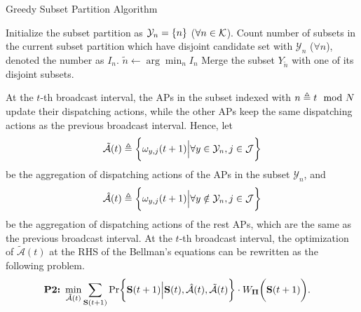 \begin{algorithm}[ht]
    \caption{Greedy Subset Partition Algorithm}\label{alg_0}
    \DontPrintSemicolon %
    Initialize the subset partition as $\mathcal{Y}_{n} = \{n\}$ ($\forall n\in\mathcal{K}$).\;
    {
        Count number of subsets in the current subset partition which have disjoint candidate set with $\mathcal{Y}_n$ ($\forall n$), denoted the number as $I_{n}$.\;
        $\tilde{n} \gets \arg\min_{n} I_{n}$\;
        Merge the subset $Y_{\tilde{n}}$ with one of its disjoint subsets.\;
    }
\end{algorithm}

At the $t$-th broadcast interval, the APs in the subset indexed with $n \triangleq t \mod{N}$ update their dispatching actions, while the other APs keep the same dispatching actions as the previous broadcast interval.
Hence, let
\begin{align}
    \tilde{\mathcal{A}}(t) \triangleq \bigg\{ {\omega}_{y,j}(t+1) \Big| \forall y\in\mathcal{Y}_{n},j\in\mathcal{J} \bigg\}
\end{align}
be the aggregation of dispatching actions of the APs in the subset $\mathcal{Y}_{n}$, and
\begin{align}
    \hat{\mathcal{A}}(t) \triangleq \bigg\{ {\omega}_{y,j}(t+1) \Big| \forall y\notin\mathcal{Y}_{n}, j\in\mathcal{J}\bigg\}
\end{align}
be the aggregation of dispatching actions of the rest APs, which are the same as the previous broadcast interval.
At the $t$-th broadcast interval, the optimization of $\tilde{\mathcal{A}}(t)$ at the RHS of the Bellman's equations can be rewritten as the following problem.
{\small
\begin{align}
    \textbf{P2:}~
    \min_{ \tilde{\mathcal{A}}(t) }
    &\sum_{\Stat(t+1)} \Pr\Brace{
        \Stat(t+1) \Big| \Stat(t), \hat{\mathcal{A}}(t), \tilde{\mathcal{A}}(t)
    } \cdot W_{\Baseline}\Paren{\Stat(t+1)}.
\end{align}
}

